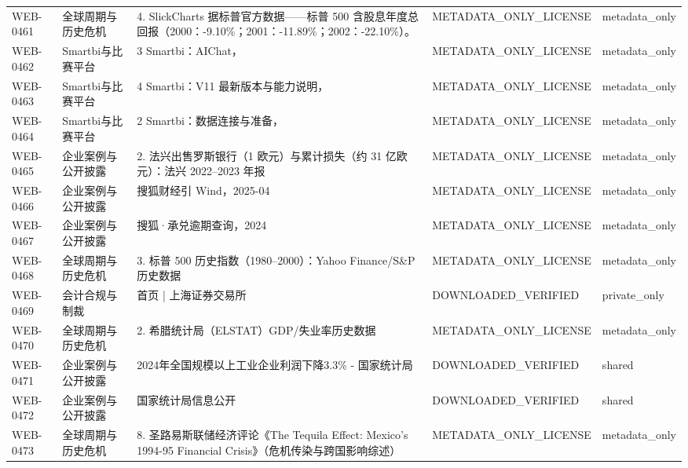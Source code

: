 \documentclass[UTF8,openany,oneside,11pt]{ctexbook}
\begin{document}
\begin{longtable}{L{1.4cm}L{2.4cm}L{6.0cm}L{3.0cm}L{1.8cm}}
WEB-\allowbreak{}0461 & 全球周期与历史危机 & 4. SlickCharts 据标普官方数据——标普 500 含股息年度总回报（2000：-\allowbreak{}9.10\%；2001：-\allowbreak{}11.89\%；2002：-\allowbreak{}22.10\%）。 & METADATA\_\allowbreak{}ONLY\_\allowbreak{}LICENSE & metadata\_\allowbreak{}only \\
WEB-\allowbreak{}0462 & Smartbi与比赛平台 & 3 Smartbi：AIChat， & METADATA\_\allowbreak{}ONLY\_\allowbreak{}LICENSE & metadata\_\allowbreak{}only \\
WEB-\allowbreak{}0463 & Smartbi与比赛平台 & 4 Smartbi：V11 最新版本与能力说明， & METADATA\_\allowbreak{}ONLY\_\allowbreak{}LICENSE & metadata\_\allowbreak{}only \\
WEB-\allowbreak{}0464 & Smartbi与比赛平台 & 2 Smartbi：数据连接与准备， & METADATA\_\allowbreak{}ONLY\_\allowbreak{}LICENSE & metadata\_\allowbreak{}only \\
WEB-\allowbreak{}0465 & 企业案例与公开披露 & 2. 法兴出售罗斯银行（1 欧元）与累计损失（约 31 亿欧元）：法兴 2022–2023 年报 & METADATA\_\allowbreak{}ONLY\_\allowbreak{}LICENSE & metadata\_\allowbreak{}only \\
WEB-\allowbreak{}0466 & 企业案例与公开披露 & 搜狐财经引 Wind，2025-\allowbreak{}04 & METADATA\_\allowbreak{}ONLY\_\allowbreak{}LICENSE & metadata\_\allowbreak{}only \\
WEB-\allowbreak{}0467 & 企业案例与公开披露 & 搜狐·承兑逾期查询，2024 & METADATA\_\allowbreak{}ONLY\_\allowbreak{}LICENSE & metadata\_\allowbreak{}only \\
WEB-\allowbreak{}0468 & 全球周期与历史危机 & 3. 标普 500 历史指数（1980–2000）：Yahoo Finance/\allowbreak{}S\&P 历史数据 & METADATA\_\allowbreak{}ONLY\_\allowbreak{}LICENSE & metadata\_\allowbreak{}only \\
WEB-\allowbreak{}0469 & 会计合规与制裁 & 首页 | 上海证券交易所 & DOWNLOADED\_\allowbreak{}VERIFIED & private\_\allowbreak{}only \\
WEB-\allowbreak{}0470 & 全球周期与历史危机 & 2. 希腊统计局（ELSTAT）GDP/\allowbreak{}失业率历史数据 & METADATA\_\allowbreak{}ONLY\_\allowbreak{}LICENSE & metadata\_\allowbreak{}only \\
WEB-\allowbreak{}0471 & 企业案例与公开披露 & 2024年全国规模以上工业企业利润下降3.3\% -\allowbreak{} 国家统计局 & DOWNLOADED\_\allowbreak{}VERIFIED & shared \\
WEB-\allowbreak{}0472 & 企业案例与公开披露 & 国家统计局信息公开 & DOWNLOADED\_\allowbreak{}VERIFIED & shared \\
WEB-\allowbreak{}0473 & 全球周期与历史危机 & 8. 圣路易斯联储经济评论《The Tequila Effect:\allowbreak{} Mexico's 1994-\allowbreak{}95 Financial Crisis》（危机传染与跨国影响综述） & METADATA\_\allowbreak{}ONLY\_\allowbreak{}LICENSE & metadata\_\allowbreak{}only \\

\end{longtable}
\end{document}
